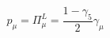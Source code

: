 \begin{equation} 
p_{\mu} = \Pi_{\mu}^{L} = \frac{1-\gamma_{5}}{2} \gamma_{\mu}   \label{eq:va} 
\end{equation} 
